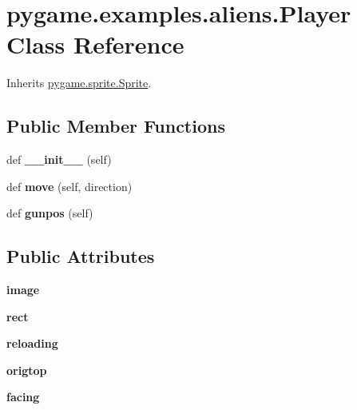 \hypertarget{classpygame_1_1examples_1_1aliens_1_1_player}{}\section{pygame.\+examples.\+aliens.\+Player Class Reference}
\label{classpygame_1_1examples_1_1aliens_1_1_player}


Inherits \hyperlink{classpygame_1_1sprite_1_1_sprite}{pygame.\+sprite.\+Sprite}.

\subsection*{Public Member Functions}
\begin{DoxyCompactItemize}
\item 
\mbox{\label{classpygame_1_1examples_1_1aliens_1_1_player_a7e44f078d27fea42c9fac15fa257d4ee}} 
def {\bfseries \+\_\+\+\_\+init\+\_\+\+\_\+} (self)
\item 
\mbox{\label{classpygame_1_1examples_1_1aliens_1_1_player_a71fdce9309e35f8efb6158db642225fb}} 
def {\bfseries move} (self, direction)
\item 
\mbox{\label{classpygame_1_1examples_1_1aliens_1_1_player_a513de11e4da88b44bab9614f5490322f}} 
def {\bfseries gunpos} (self)
\end{DoxyCompactItemize}
\subsection*{Public Attributes}
\begin{DoxyCompactItemize}
\item 
\mbox{\label{classpygame_1_1examples_1_1aliens_1_1_player_ad670a46fedfcc98e5a7cbdb4316251f9}} 
{\bfseries image}
\item 
\mbox{\label{classpygame_1_1examples_1_1aliens_1_1_player_a63fec06121fa9753266293acd1a23082}} 
{\bfseries rect}
\item 
\mbox{\label{classpygame_1_1examples_1_1aliens_1_1_player_a669465e43b373530256360f46d574d4e}} 
{\bfseries reloading}
\item 
\mbox{\label{classpygame_1_1examples_1_1aliens_1_1_player_a712af5cc3c6c8468d4a6bd8e6e675eac}} 
{\bfseries origtop}
\item 
\mbox{\label{classpygame_1_1examples_1_1aliens_1_1_player_aaf5f2687a8d3ba7cca74b71232b517c0}} 
{\bfseries facing}
\end{DoxyCompactItemize}
